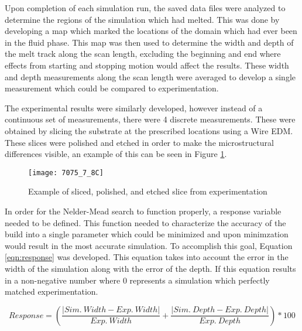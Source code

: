 \label{sim_analysis}

Upon completion of each simulation run, the saved data files were analyzed to determine the regions of the simulation which had melted.  This was done by developing a map which marked the locations of the domain which had ever been in the fluid phase.  This map was then used to determine the width and depth of the melt track along the scan length, excluding the beginning and end where effects from starting and stopping motion would affect the results.  These width and depth measurements along the scan length were averaged to develop a single measurement which could be compared to experimentation.  

The experimental results were similarly developed, however instead of a continuous set of measurements, there were 4 discrete measurements.  These were obtained by slicing the substrate at the prescribed locations using a Wire \ac{EDM}.  These slices were polished and etched in order to make the microstructural differences visible, an example of this can be seen in Figure \ref{fig:7075_7_8C}.
\begin{figure}[!htb]
	\centering
	\texttt{[image: 7075\_7\_8C]}
	\caption{Example of sliced, polished, and etched slice from experimentation}
	\label{fig:7075_7_8C}
\end{figure}

In order for the Nelder-Mead search to function properly, a response variable needed to be defined.  This function needed to characterize the accuracy of the build into a single parameter which could be minimized and upon minimzation would result in the most accurate simulation.  To accomplish this goal, Equation \ref{eqn:response} was developed.  This equation takes into account the error in the width of the simulation along with the error of the depth.  If this equation results in a non-negative number where 0 represents a simulation which perfectly matched experimentation.

\begin{equation}\label{eqn:response}
	Response = \left( \frac{\lvert Sim.\ Width - Exp.\ Width \rvert}{Exp.\ Width} + \frac{\lvert Sim.\ Depth - Exp.\ Depth \rvert}{Exp.\ Depth} \right) * 100
\end{equation}